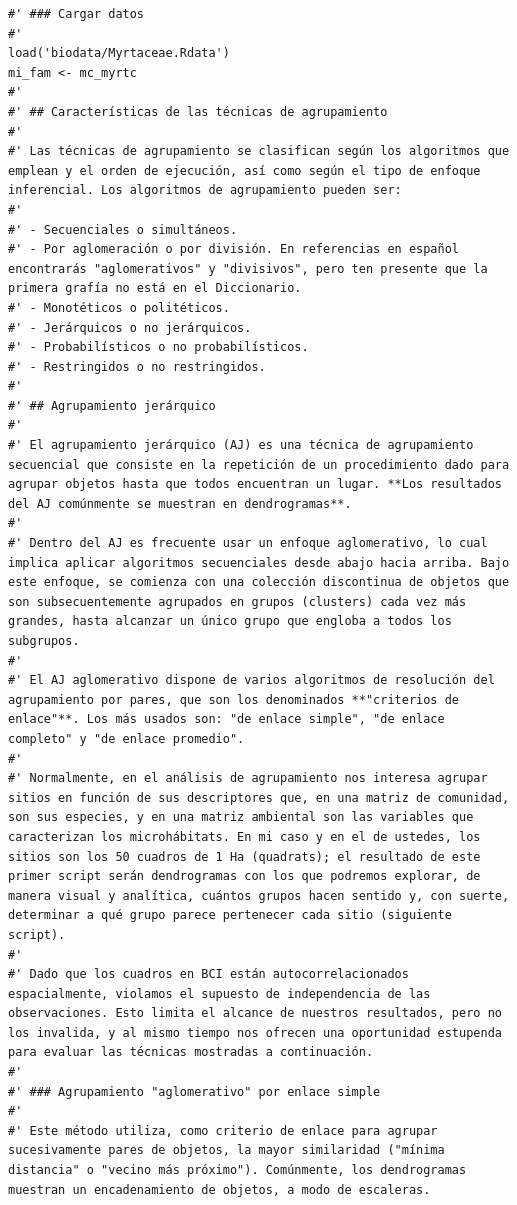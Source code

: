 \documentclass[11pt,]{article}
\begin{document}
\begin{verbatim}
#' ### Cargar datos
#' 
load('biodata/Myrtaceae.Rdata')
mi_fam <- mc_myrtc
#'
#' ## Características de las técnicas de agrupamiento
#' 
#' Las técnicas de agrupamiento se clasifican según los algoritmos que emplean y el orden de ejecución, así como según el tipo de enfoque inferencial. Los algoritmos de agrupamiento pueden ser:
#' 
#' - Secuenciales o simultáneos.
#' - Por aglomeración o por división. En referencias en español encontrarás "aglomerativos" y "divisivos", pero ten presente que la primera grafía no está en el Diccionario.
#' - Monotéticos o politéticos.
#' - Jerárquicos o no jerárquicos.
#' - Probabilísticos o no probabilísticos.
#' - Restringidos o no restringidos.
#' 
#' ## Agrupamiento jerárquico
#' 
#' El agrupamiento jerárquico (AJ) es una técnica de agrupamiento secuencial que consiste en la repetición de un procedimiento dado para agrupar objetos hasta que todos encuentran un lugar. **Los resultados del AJ comúnmente se muestran en dendrogramas**.
#' 
#' Dentro del AJ es frecuente usar un enfoque aglomerativo, lo cual implica aplicar algoritmos secuenciales desde abajo hacia arriba. Bajo este enfoque, se comienza con una colección discontinua de objetos que son subsecuentemente agrupados en grupos (clusters) cada vez más grandes, hasta alcanzar un único grupo que engloba a todos los subgrupos.
#' 
#' El AJ aglomerativo dispone de varios algoritmos de resolución del agrupamiento por pares, que son los denominados **"criterios de enlace"**. Los más usados son: "de enlace simple", "de enlace completo" y "de enlace promedio".
#' 
#' Normalmente, en el análisis de agrupamiento nos interesa agrupar sitios en función de sus descriptores que, en una matriz de comunidad, son sus especies, y en una matriz ambiental son las variables que caracterizan los microhábitats. En mi caso y en el de ustedes, los sitios son los 50 cuadros de 1 Ha (quadrats); el resultado de este primer script serán dendrogramas con los que podremos explorar, de manera visual y analítica, cuántos grupos hacen sentido y, con suerte, determinar a qué grupo parece pertenecer cada sitio (siguiente script).
#' 
#' Dado que los cuadros en BCI están autocorrelacionados espacialmente, violamos el supuesto de independencia de las observaciones. Esto limita el alcance de nuestros resultados, pero no los invalida, y al mismo tiempo nos ofrecen una oportunidad estupenda para evaluar las técnicas mostradas a continuación.
#' 
#' ### Agrupamiento "aglomerativo" por enlace simple
#' 
#' Este método utiliza, como criterio de enlace para agrupar sucesivamente pares de objetos, la mayor similaridad ("mínima distancia" o "vecino más próximo"). Comúnmente, los dendrogramas muestran un encadenamiento de objetos, a modo de escaleras.

\end{verbatim}
\end{document}
